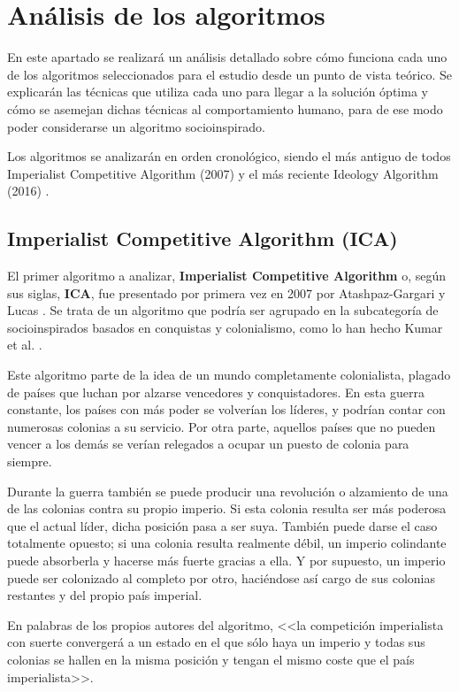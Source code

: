 \chapter{Análisis de los algoritmos}

En este apartado se realizará un análisis detallado sobre cómo funciona cada uno de los algoritmos seleccionados para el estudio desde un punto de vista teórico. Se explicarán las técnicas que utiliza cada uno para llegar a la solución óptima y cómo se asemejan dichas técnicas al comportamiento humano, para de ese modo poder considerarse un algoritmo socioinspirado.

Los algoritmos se analizarán en orden cronológico, siendo el más antiguo de todos Imperialist Competitive Algorithm (2007) \cite{ica-conference} y el más reciente Ideology Algorithm (2016) \cite{ia-article}.

\section{Imperialist Competitive Algorithm (ICA)}

El primer algoritmo a analizar, \textbf{Imperialist Competitive Algorithm} o, según sus siglas, \textbf{ICA}, fue presentado por primera vez en 2007 por Atashpaz-Gargari y Lucas \cite{ica-conference}. Se trata de un algoritmo que podría ser agrupado en la subcategoría de socioinspirados basados en conquistas y colonialismo, como lo han hecho Kumar et al. \cite{socio-evolution-algorithm}.

Este algoritmo parte de la idea de un mundo completamente colonialista, plagado de países que luchan por alzarse vencedores y conquistadores. En esta guerra constante, los países con más poder se volverían los líderes, y podrían contar con numerosas colonias a su servicio. Por otra parte, aquellos países que no pueden vencer a los demás se verían relegados a ocupar un puesto de colonia para siempre.

Durante la guerra también se puede producir una revolución o alzamiento de una de las colonias contra su propio imperio. Si esta colonia resulta ser más poderosa que el actual líder, dicha posición pasa a ser suya. También puede darse el caso totalmente opuesto; si una colonia resulta realmente débil, un imperio colindante puede absorberla y hacerse más fuerte gracias a ella. Y por supuesto, un imperio puede ser colonizado al completo por otro, haciéndose así cargo de sus colonias restantes y del propio país imperial.

En palabras de los propios autores del algoritmo, <<la competición imperialista con suerte convergerá a un estado en el que sólo haya un imperio y todas sus colonias se hallen en la misma posición y tengan el mismo coste que el país imperialista>>.

